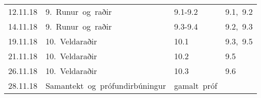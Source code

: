 \begin{longtable}{c|l|l|l}
\hline

12.11.18&
9.~Runur~og~raðir&
9.1-9.2&
9.1,~9.2\\
14.11.18&
9.~Runur~og~raðir&
9.3-9.4&
9.2,~9.3\\

\hline

19.11.18&
10.~Veldaraðir&
10.1&
9.3,~9.5\\
21.11.18&
10.~Veldaraðir&
10.2&
9.5\\

\hline

26.11.18&
10.~Veldaraðir&
10.3&
9.6\\
28.11.18&
Samantekt~og~prófundirbúningur&
gamalt~próf&
\\
\hline
\end{longtable}
